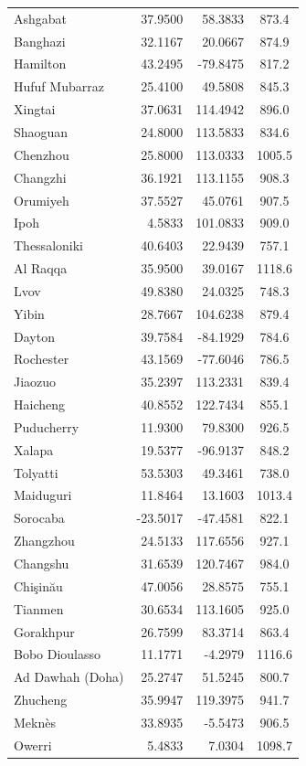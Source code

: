 \begin{longtable}{lrrc}
Ashgabat & 37.9500 & 58.3833 & 873.4 \\
Banghazi & 32.1167 & 20.0667 & 874.9 \\
Hamilton & 43.2495 & -79.8475 & 817.2 \\
Hufuf Mubarraz & 25.4100 & 49.5808 & 845.3 \\
Xingtai & 37.0631 & 114.4942 & 896.0 \\
Shaoguan & 24.8000 & 113.5833 & 834.6 \\
Chenzhou & 25.8000 & 113.0333 & 1005.5 \\
Changzhi & 36.1921 & 113.1155 & 908.3 \\
Orumiyeh & 37.5527 & 45.0761 & 907.5 \\
Ipoh & 4.5833 & 101.0833 & 909.0 \\
Thessaloniki & 40.6403 & 22.9439 & 757.1 \\
Al Raqqa & 35.9500 & 39.0167 & 1118.6 \\
Lvov & 49.8380 & 24.0325 & 748.3 \\
Yibin & 28.7667 & 104.6238 & 879.4 \\
Dayton & 39.7584 & -84.1929 & 784.6 \\
Rochester & 43.1569 & -77.6046 & 786.5 \\
Jiaozuo & 35.2397 & 113.2331 & 839.4 \\
Haicheng & 40.8552 & 122.7434 & 855.1 \\
Puducherry & 11.9300 & 79.8300 & 926.5 \\
Xalapa & 19.5377 & -96.9137 & 848.2 \\
Tolyatti & 53.5303 & 49.3461 & 738.0 \\
Maiduguri & 11.8464 & 13.1603 & 1013.4 \\
Sorocaba & -23.5017 & -47.4581 & 822.1 \\
Zhangzhou & 24.5133 & 117.6556 & 927.1 \\
Changshu & 31.6539 & 120.7467 & 984.0 \\
Chişinău & 47.0056 & 28.8575 & 755.1 \\
Tianmen & 30.6534 & 113.1605 & 925.0 \\
Gorakhpur & 26.7599 & 83.3714 & 863.4 \\
Bobo Dioulasso & 11.1771 & -4.2979 & 1116.6 \\
Ad Dawhah (Doha) & 25.2747 & 51.5245 & 800.7 \\
Zhucheng & 35.9947 & 119.3975 & 941.7 \\
Meknès & 33.8935 & -5.5473 & 906.5 \\
Owerri & 5.4833 & 7.0304 & 1098.7 \\

\end{longtable}
